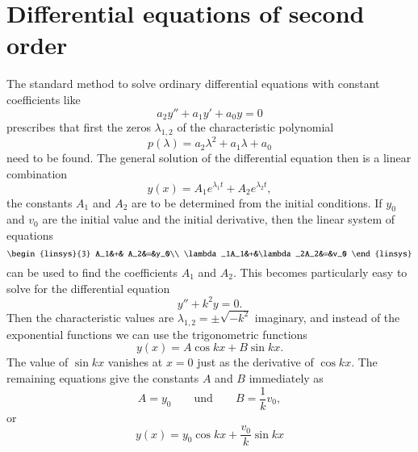 %
%
%
\section{Differential equations of second order}
The standard method to solve ordinary differential equations
with constant coefficients like
\[
a_2y''+ a_1y'+a_0y=0
\]
prescribes that first the zeros $\lambda_{1,2}$ of the characteristic
polynomial
\[
p(\lambda)=a_2\lambda^2+a_1\lambda+a_0
\]
need to be found.
The general solution of the differential equation then is a linear
combination
\[
y(x)=
A_1 e^{\lambda_1t}
+
A_2 e^{\lambda_2t},
\]
the constants $A_1$ and $A_2$ are to be determined from the initial
conditions.
If $y_0$ and $v_0$ are the initial value and the initial derivative,
then the linear system of equations
\[
\begin{linsys}{3}
         A_1&+&         A_2&=&y_0\\
\lambda_1A_1&+&\lambda_2A_2&=&v_0
\end{linsys}
\]
can be used to find the coefficients $A_1$ and $A_2$.
This becomes particularly easy to solve for the differential equation
\[
y''+k^2 y=0.
\]
Then the characteristic values are $\lambda_{1,2}=\pm\sqrt{-k^2}$ imaginary,
and instead of the exponential functions we can use the trigonometric
functions
\[
y(x)=A\cos kx+B\sin kx.
\]
The value of $\sin kx$ vanishes at $x=0$ just as the derivative
of $\cos kx$.
The remaining equations give the constants $A$ and $B$ immediately as
\[
A=y_0
\qquad\text{und}\qquad
B=\frac1kv_0,
\]
or
\begin{equation}
y(x)=y_0\cos kx + \frac{v_0}{k}\sin kx
\label{hyp:loesung}
\end{equation}


